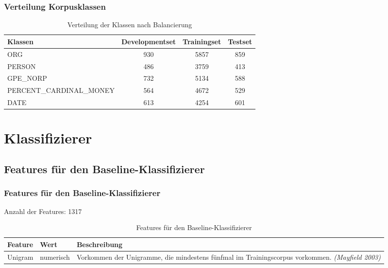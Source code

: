 \documentclass{beamer}
\begin{document}
	\begin{frame}
			\frametitle{Verteilung Korpusklassen}
			 \begin{table}
			 	\caption{Verteilung der Klassen nach Balancierung}
			 	\begin{tabular}{lccc}
			 		\toprule
			 		Klassen  & Developmentset & Trainingset & Testset \\
			 		\midrule
			 		ORG  & 930 & 5857 & 859 \\
			 		PERSON & 486 & 3759 & 413 \\
			 		GPE\_NORP & 732 & 5134 & 588 \\
			 		PERCENT\_CARDINAL\_MONEY & 564 & 4672 & 529 \\
			 		DATE & 613 & 4254 & 601 \\
			 		\bottomrule
			 	\end{tabular}
			 	\label{tab:datasets}
			 \end{table}
	\end{frame}


\section{Klassifizierer}
	\subsection{Features für den Baseline-Klassifizierer}
	\begin{frame}
		\frametitle{Features für den Baseline-Klassifizierer}
		Anzahl der Features: 1317
					 \begin{table}
					 	\caption{Features für den Baseline-Klassifizierer}
					 	\begin{tabularx}{\textwidth}{llX}
					 		\toprule
							Feature & Wert & Beschreibung\\
					 		\midrule
					 		Unigram & numerisch & Vorkommen der Unigramme, die mindestens fünfmal im Trainingscorpus vorkommen. \textit{(Mayfield 2003)} \\
					 		\bottomrule
					 	\end{tabularx}
					 	\label{tab:baselinef}
					 \end{table}
	\end{frame}
\end{document}
